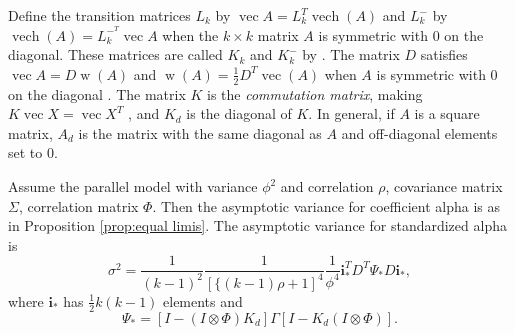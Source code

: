 \documentclass[twoside]{article}
\DeclareMathOperator{\vvec}{vec}
\DeclareMathOperator{\vech}{vech}
\DeclareMathOperator{\w}{w}
\begin{document}
Define the transition matrices $L_{k}$ by $\vvec A=L_{k}^{T}\vech(A)$
and $L_{k}^{-}$ by $\vech(A)=L_{k}^{-^{T}}\vvec A$ when the $k\times k$
matrix $A$ is symmetric with $0$ on the diagonal. These matrices
are called $K_{k}$ and $K_{k}^{-}$ by \citet{Van_Zyl2000-si}. The
matrix $D$ satisfies $\vvec A=D\w(A)$ and $\w(A)=\frac{1}{2}D^{T}\vvec(A)$
when $A$ is symmetric with $0$ on the diagonal \citep{Neudecker1996-fu}.
The matrix $K$ is the \emph{commutation matrix}, making $K\vvec X=\vvec X^{T}$
\citep[see][Chapter 3.8]{Magnus2019-cz}, and $K_{d}$ is the diagonal
of $K$. In general, if $A$ is a square matrix, $A_{d}$ is the matrix
with the same diagonal as $A$ and off-diagonal elements set to $0$. 
\begin{lem}
\label{lem:variances}Assume the parallel model with variance $\phi^{2}$
and correlation $\rho$, covariance matrix $\Sigma$, correlation
matrix $\Phi$. Then the asymptotic variance for coefficient alpha is as in Proposition \ref{prop:equal limis}. The asymptotic variance for standardized alpha is 
\begin{equation}
\nonumber
\sigma^{2}=\frac{1}{(k-1)^{2}}\frac{1}{[\{(k-1)\rho+1]^{4}}\frac{1}{\phi^{4}}\mathbf{i}_{*}^{T}D^{T}\Psi_{*}D\mathbf{i}_{*},
\end{equation}
where $\mathbf{i}_{*}$ has $\frac{1}{2}k(k-1)$ elements and
\[
\Psi_{*}=[I-(I\otimes\Phi)K_{d}]\Gamma[I-K_{d}(I\otimes\Phi)].
\]
\end{lem}
\end{document}
